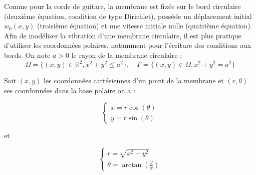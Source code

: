 \documentclass[a4,12pt]{article}
\newcommand{\R}{\mathbb{R}}
\begin{document}
                     Comme pour la corde de guitare, la membrane est fixée sur le bord circulaire (deuxième équation, condition de type Dirichlet), possède un déplacement initial $w_0(x,y)$ (troisième équation) et une vitesse initiale nulle (quatrième équation). Afin de modéliser la vibration d'une membrane circulaire, il est plus pratique d'utiliser les coordonnées polaires, notamment pour l'écriture des conditions aux bords. On note $a>0$ le rayon de la membrane circulaire : 
                     \[
                     \Omega=\{(x,y)\in \R^2, x^2+y^2 \leq a^2\}, \quad \Gamma=\{(x,y)\in \Omega,  x^2+y^2 = a^2\}
                     \]

                     Soit $(x,y)$ les coordonnées cartésiennes d'un point de la membrane et $(r,\theta)$ ses coordonnées dans la base polaire on a :
                     \begin{center}
                     \begin{minipage}[l]{.9\linewidth}

                     \begin{minipage}[l]{.4\linewidth}
                     \begin{equation*} 
                     \left\{ 
                     \begin{array}{rcl}
                     x=r\cos(\theta) \\
                       y=r\sin(\theta)
                       \end{array} 
                       \right.
                       \end{equation*}
                       \end{minipage}
                       et
                       \begin{minipage}[r]{.4\linewidth}
                       \begin{equation*} 
                       \left\{ 
                       \begin{array}{rcl}
                       r=\sqrt{x^2+y^2} \\
                         \theta=\arctan(\frac{y}{x})
                         \end{array} 
                         \right.
                         \end{equation*}
                         \end{minipage}

                         \end{minipage}
                         \end{center}
\end{document}
